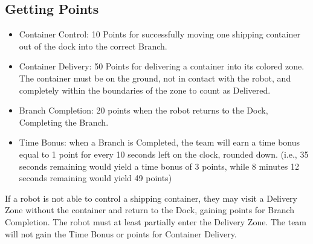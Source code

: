 \documentclass[a4paper,12pt]{article}
\begin{document}
\subsection{Getting Points}
\begin{itemize}
    \item Container Control: 10 Points for successfully moving one shipping container out of the dock into the correct Branch. 
    \item Container Delivery: 50 Points for delivering a container into its colored zone. The container must be on the ground, not in contact with the robot, and completely within the boundaries of the zone to count as Delivered.
    \item Branch Completion: 20 points when the robot returns to the Dock, Completing the Branch.
    \item Time Bonus: when a Branch is Completed, the team will earn a time bonus equal to 1 point for every 10 seconds left on the clock, rounded down. (i.e., 35 seconds remaining would yield a time bonus of 3 points, while 8 minutes 12 seconds remaining would yield 49 points)
\end{itemize}

\noindent
If a robot is not able to control a shipping container, they may visit a Delivery Zone without the container and return to the Dock, gaining points for Branch Completion. The robot must at least partially enter the Delivery Zone. The team will not gain the Time Bonus or points for Container Delivery.
\end{document}
